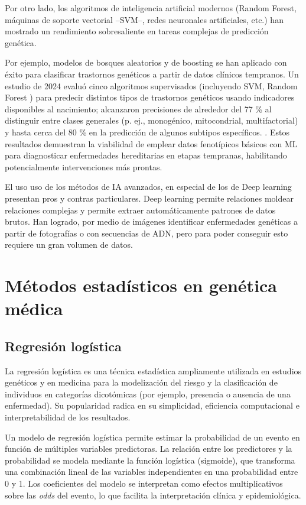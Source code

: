 \documentclass[11pt,a4paper,spanish]{book}
\numberwithin{equation}{chapter}
\numberwithin{figure}{chapter}
\begin{document}
Por otro lado, los algoritmos de inteligencia artificial modernos (Random Forest, máquinas de soporte vectorial –SVM–, redes neuronales artificiales, etc.) han mostrado un rendimiento sobresaliente en tareas complejas de predicción genética\cite{chafai_2023}.

Por ejemplo, modelos de bosques aleatorios y de boosting se han aplicado con éxito para clasificar trastornos genéticos a partir de datos clínicos tempranos. Un estudio de 2024 evaluó cinco algoritmos supervisados (incluyendo SVM, Random Forest ) para predecir distintos tipos de trastornos genéticos usando indicadores disponibles al nacimiento; alcanzaron precisiones de alrededor del 77 \% al distinguir entre clases generales (p. ej., monogénico, mitocondrial, multifactorial) y hasta cerca del 80 \% en la predicción de algunos subtipos específicos.\cite{Siddik2024} \cite{kocejko_2024}. 
Estos resultados demuestran la viabilidad de emplear datos fenotípicos básicos con ML para diagnosticar enfermedades hereditarias en etapas tempranas, habilitando potencialmente intervenciones más prontas.

El uso uso de los métodos de IA avanzados, en especial de los de Deep learning presentan pros y contras particulares. Deep learning permite relaciones moldear relaciones complejas y permite extraer automáticamente patrones de datos brutos\cite{LeCun_2015}.
Han logrado, por medio de imágenes identificar enfermedades genéticas a partir de fotografías\cite{Hsieh_2019} o con secuencias de ADN\cite{Libbrecht2015}, pero para poder conseguir esto requiere un gran volumen de datos\cite{Ching_2018}.


\section{Métodos estadísticos en genética médica}
\subsection{Regresión logística}

La regresión logística es una técnica estadística ampliamente utilizada en estudios genéticos y en medicina para la modelización del riesgo y la clasificación de individuos en categorías dicotómicas (por ejemplo, presencia o ausencia de una enfermedad). Su popularidad radica en su simplicidad, eficiencia computacional e interpretabilidad de los resultados\cite{bush_2012}.

Un modelo de regresión logística permite estimar la probabilidad de un evento en función de múltiples variables predictoras. La relación entre los predictores y la probabilidad se modela mediante la función logística (sigmoide), que transforma una combinación lineal de las variables independientes en una probabilidad entre 0 y 1. Los coeficientes del modelo se interpretan como efectos multiplicativos sobre las \textit{odds} del evento, lo que facilita la interpretación clínica y epidemiológica\cite{hosmer_2013}.
\end{document}
